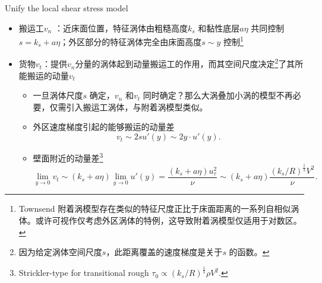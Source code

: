 \documentclass[10pt,xcolor={table,dvipsnames},t]{beamer}
\newcommand{\his}{\textsuperscript{\ddag}}
\begin{document}
\begin{frame}{Unify the local shear stress model}
    \begin{itemize}
        \item 搬运工$v_n$ ：近床面位置，特征涡体由粗糙高度$k_s$ 和黏性底层$a\eta$ 共同控制 $s = k_s + a\eta$\ddag；外区部分的特征涡体完全由床面高度$s\sim y$ 控制\footnote{Townsend 附着涡模型存在类似的特征尺度正比于床面距离的一系列自相似涡体。或许可视作仅考虑外区涡体的特例，这导致附着涡模型仅适用于对数区\cite{aemmarusic2019}。}
        \item 货物$v_t$\his ：提供$v_n$分量的涡体起到动量搬运工的作用，而其空间尺度决定\footnote{因为给定涡体空间尺度$s$，此距离覆盖的速度梯度是关于$s$ 的函数。}了其所能搬运的动量$v_t$ 
            \begin{itemize}
                \item 一旦涡体尺度$s$ 确定，$v_n$ 和$v_t$ 同时确定？那么大涡叠加小涡的模型不再必要，仅需引入搬运工涡体，与附着涡模型类似。
                \item 外区速度梯度引起的能够搬运的动量差 $$v_t \sim 2s u'(y) \sim 2y \cdot u'(y).$$
                \item 壁面附近的动量差\his \footnote{Strickler-type for transitional rough $\tau_0 \propto \left( k_s / R \right) ^{\frac{1}{3}} \rho V^2 $.}
                    $$\lim_{y \to 0} v_t \sim \left( k_s + a\eta \right) \lim_{y \to 0} u'(y) =  \frac{(k_s + a \eta)u_{\tau}^2}{\nu} \sim (k_s + a\eta) \frac{\left( k_s / R \right)^{\frac{1}{3}} V^2}{\nu}.$$
            \end{itemize}
    \end{itemize}
\end{frame}
\end{document}
